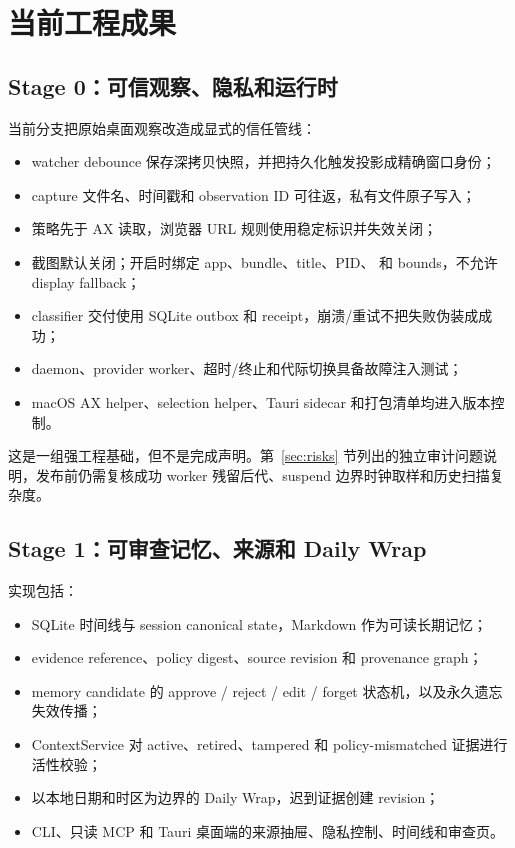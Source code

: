 \documentclass[UTF8,fontset=none,zihao=-4,openany]{ctexrep}
\newcommand{\code}[1]{\texttt{\detokenize{#1}}}
\begin{document}
\chapter{当前工程成果}

\section{Stage 0：可信观察、隐私和运行时}

当前分支把原始桌面观察改造成显式的信任管线：

\begin{itemize}
  \item watcher debounce 保存深拷贝快照，并把持久化触发投影成精确窗口身份；
  \item capture 文件名、时间戳和 observation ID 可往返，私有文件原子写入；
  \item 策略先于 AX 读取，浏览器 URL 规则使用稳定标识并失效关闭；
  \item 截图默认关闭；开启时绑定 app、bundle、title、PID、\code{CGWindowID} 和 bounds，不允许 display fallback；
  \item classifier 交付使用 SQLite outbox 和 receipt，崩溃/重试不把失败伪装成成功；
  \item daemon、provider worker、超时/终止和代际切换具备故障注入测试；
  \item macOS AX helper、selection helper、Tauri sidecar 和打包清单均进入版本控制。
\end{itemize}

这是一组强工程基础，但不是完成声明。第~\ref{sec:risks} 节列出的独立审计问题说明，发布前仍需复核成功 worker 残留后代、suspend 边界时钟取样和历史扫描复杂度。

\section{Stage 1：可审查记忆、来源和 Daily Wrap}

实现包括：

\begin{itemize}
  \item SQLite 时间线与 session canonical state，Markdown 作为可读长期记忆；
  \item evidence reference、policy digest、source revision 和 provenance graph；
  \item memory candidate 的 approve / reject / edit / forget 状态机，以及永久遗忘失效传播；
  \item ContextService 对 active、retired、tampered 和 policy-mismatched 证据进行活性校验；
  \item 以本地日期和时区为边界的 Daily Wrap，迟到证据创建 revision；
  \item CLI、只读 MCP 和 Tauri 桌面端的来源抽屉、隐私控制、时间线和审查页。
\end{itemize}
\end{document}
